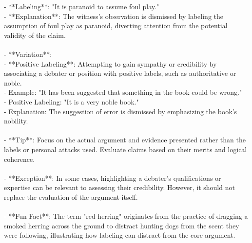 \documentclass[a4paper,12pt,single,pdftex]{scrartcl}
\begin{document}
    
        - **Labeling**: "It is paranoid to assume foul play."
    \\

    
        - **Explanation**: The witness's observation is dismissed by labeling the assumption of foul play as paranoid, diverting attention from the potential validity of the claim.
    \\

    
      
    \\

    
      - **Variation**:
    \\

    
        - **Positive Labeling**: Attempting to gain sympathy or credibility by associating a debater or position with positive labels, such as authoritative or noble.
    \\

    
          - Example: "It has been suggested that something in the book could be wrong."
    \\

    
          - Positive Labeling: "It is a very noble book."
    \\

    
          - Explanation: The suggestion of error is dismissed by emphasizing the book's nobility.
    \\

    
      
    \\

    
      - **Tip**: Focus on the actual argument and evidence presented rather than the labels or personal attacks used. Evaluate claims based on their merits and logical coherence.
    \\

    
      
    \\

    
      - **Exception**: In some cases, highlighting a debater's qualifications or expertise can be relevant to assessing their credibility. However, it should not replace the evaluation of the argument itself.
    \\

    
      
    \\

    
      - **Fun Fact**: The term "red herring" originates from the practice of dragging a smoked herring across the ground to distract hunting dogs from the scent they were following, illustrating how labeling can distract from the core argument.
    \\
\end{document}
